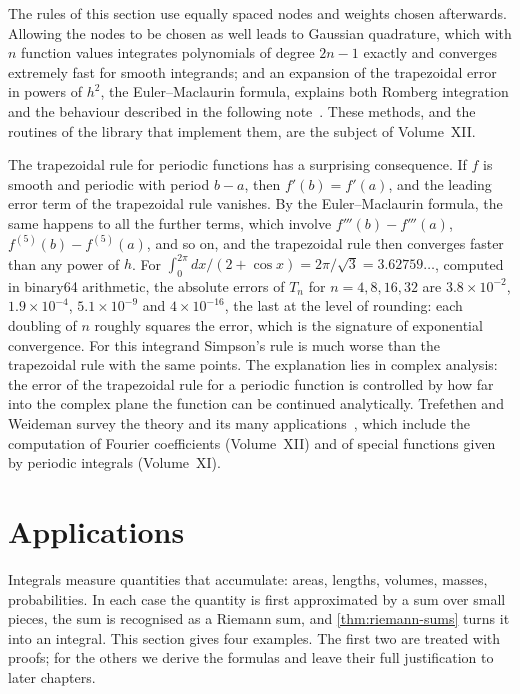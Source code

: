 The rules of this section use equally spaced nodes and weights chosen afterwards. Allowing the nodes to be chosen as well leads to Gaussian quadrature, which with $n$ function values integrates polynomials of degree $2n-1$ exactly and converges extremely fast for smooth integrands; and an expansion of the trapezoidal error in powers of $h^2$, the Euler--Maclaurin formula, explains both Romberg integration and the behaviour described in the following note~\cite{davis1984}. These methods, and the routines of the library that implement them, are the subject of Volume~XII.

\begin{note}{The trapezoidal rule for periodic functions}
 has a surprising consequence. If $f$ is smooth and periodic with period $b-a$, then $f'(b)=f'(a)$, and the leading error term of the trapezoidal rule vanishes. By the Euler--Maclaurin formula, the same happens to all the further terms, which involve $f'''(b)-f'''(a)$, $f^{(5)}(b)-f^{(5)}(a)$, and so on, and the trapezoidal rule then converges faster than any power of $h$. For $\int_0^{2\pi}dx/(2+\cos x)=2\pi/\sqrt3=3.62759\ldots$, computed in binary64 arithmetic, the absolute errors of $T_n$ for $n=4,8,16,32$ are $3.8\times10^{-2}$, $1.9\times10^{-4}$, $5.1\times10^{-9}$ and $4\times10^{-16}$, the last at the level of rounding: each doubling of $n$ roughly squares the error, which is the signature of exponential convergence. For this integrand Simpson's rule is much worse than the trapezoidal rule with the same points. The explanation lies in complex analysis: the error of the trapezoidal rule for a periodic function is controlled by how far into the complex plane the function can be continued analytically. Trefethen and Weideman survey the theory and its many applications~\cite{trefethen2014}, which include the computation of Fourier coefficients (Volume~XII) and of special functions given by periodic integrals (Volume~XI).
\end{note}

\section{Applications}
\label{sec:integral-applications}

Integrals measure quantities that accumulate: areas, lengths, volumes, masses, probabilities. In each case the quantity is first approximated by a sum over small pieces, the sum is recognised as a Riemann sum, and \cref{thm:riemann-sums} turns it into an integral. This section gives four examples. The first two are treated with proofs; for the others we derive the formulas and leave their full justification to later chapters.

